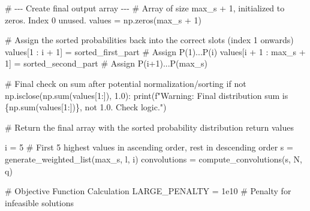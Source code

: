 \documentclass[
  letterpaper,
  DIV=11,
  numbers=noendperiod]{scrartcl}
\newenvironment{Shaded}{\begin{snugshade}}{\end{snugshade}}
\newcommand{\BuiltInTok}[1]{\textcolor[rgb]{0.00,0.23,0.31}{#1}}
\newcommand{\CommentTok}[1]{\textcolor[rgb]{0.37,0.37,0.37}{#1}}
\newcommand{\ControlFlowTok}[1]{\textcolor[rgb]{0.00,0.23,0.31}{#1}}
\newcommand{\DecValTok}[1]{\textcolor[rgb]{0.68,0.00,0.00}{#1}}
\newcommand{\FloatTok}[1]{\textcolor[rgb]{0.68,0.00,0.00}{#1}}
\newcommand{\KeywordTok}[1]{\textcolor[rgb]{0.00,0.23,0.31}{#1}}
\newcommand{\NormalTok}[1]{\textcolor[rgb]{0.00,0.23,0.31}{#1}}
\newcommand{\OperatorTok}[1]{\textcolor[rgb]{0.37,0.37,0.37}{#1}}
\newcommand{\SpecialCharTok}[1]{\textcolor[rgb]{0.37,0.37,0.37}{#1}}
\newcommand{\SpecialStringTok}[1]{\textcolor[rgb]{0.13,0.47,0.30}{#1}}
\begin{document}
\begin{Shaded}
\begin{Highlighting}[]
    \CommentTok{\# {-}{-}{-} Create final output array {-}{-}{-}}
    \CommentTok{\# Array of size max\_s + 1, initialized to zeros. Index 0 unused.}
\NormalTok{    values }\OperatorTok{=}\NormalTok{ np.zeros(max\_s }\OperatorTok{+} \DecValTok{1}\NormalTok{)}

    \CommentTok{\# Assign the sorted probabilities back into the correct slots (index 1 onwards)}
\NormalTok{    values[}\DecValTok{1}\NormalTok{ : i }\OperatorTok{+} \DecValTok{1}\NormalTok{] }\OperatorTok{=}\NormalTok{ sorted\_first\_part      }\CommentTok{\# Assign P(1)...P(i)}
\NormalTok{    values[i }\OperatorTok{+} \DecValTok{1}\NormalTok{ : max\_s }\OperatorTok{+} \DecValTok{1}\NormalTok{] }\OperatorTok{=}\NormalTok{ sorted\_second\_part }\CommentTok{\# Assign P(i+1)...P(max\_s)}

    \CommentTok{\# Final check on sum after potential normalization/sorting}
    \ControlFlowTok{if} \KeywordTok{not}\NormalTok{ np.isclose(np.}\BuiltInTok{sum}\NormalTok{(values[}\DecValTok{1}\NormalTok{:]), }\FloatTok{1.0}\NormalTok{):}
         \BuiltInTok{print}\NormalTok{(}\SpecialStringTok{f"Warning: Final distribution sum is }\SpecialCharTok{\{}\NormalTok{np}\SpecialCharTok{.}\BuiltInTok{sum}\NormalTok{(values[}\DecValTok{1}\NormalTok{:])}\SpecialCharTok{\}}\SpecialStringTok{, not 1.0. Check logic."}\NormalTok{)}

    \CommentTok{\# Return the final array with the sorted probability distribution}
    \ControlFlowTok{return}\NormalTok{ values}

\NormalTok{i }\OperatorTok{=} \DecValTok{5}  \CommentTok{\# First 5 highest values in ascending order, rest in descending order}
\NormalTok{s }\OperatorTok{=}\NormalTok{ generate\_weighted\_list(max\_s, l, i)}
\NormalTok{convolutions }\OperatorTok{=}\NormalTok{ compute\_convolutions(s, N, q)}

\CommentTok{\# Objective Function Calculation}
\NormalTok{LARGE\_PENALTY }\OperatorTok{=} \FloatTok{1e10} \CommentTok{\# Penalty for infeasible solutions}


\end{Highlighting}
\end{Shaded}
\end{document}
